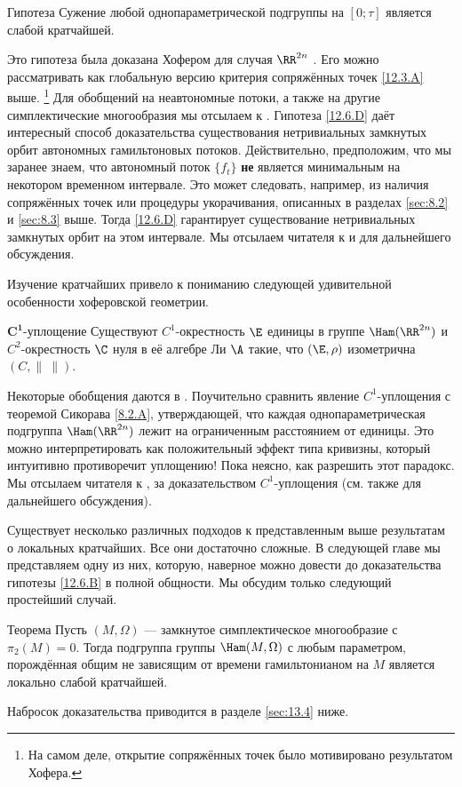 \begin{thm}{Гипотеза}\label{12.6.D}
Сужение любой однопараметрической подгруппы на $[0;\tau]$ является слабой кратчайшей.
\end{thm}

Это гипотеза была доказана Хофером для случая $\RR^{2n}$ \cite{H2}.
Его можно рассматривать как глобальную версию критерия сопряжённых точек \ref{12.3.A} выше.%
\footnote{На самом деле, открытие сопряжённых точек было мотивировано результатом Хофера.} 
Для обобщений на неавтономные потоки, а также на другие симплектические многообразия мы отсылаем к \cite{BP1, Si1,LM2,Sch3,MSl}.
Гипотеза \ref{12.6.D} даёт интересный способ доказательства существования нетривиальных замкнутых орбит автономных гамильтоновых потоков.
Действительно, предположим, что мы заранее знаем, что автономный поток $\{f_t\}$ \textbf{не} является минимальным на некотором временном интервале.
Это может следовать, например, из наличия сопряжённых точек или процедуры укорачивания, описанных в разделах \ref{sec:8.2} и \ref{sec:8.3} выше.
Тогда \ref{12.6.D} гарантирует существование нетривиальных замкнутых орбит на этом интервале.
Мы отсылаем читателя к \cite{LM2} и \cite{P8} для дальнейшего обсуждения.

Изучение кратчайших привело к пониманию следующей удивительной особенности хоферовской геометрии.

\begin{thm}[\cite{BP1}.]{$\bm{C^1}$-уплощение}
\label{12.6.E}
Существуют $C^1$-окрестность $\E$ единицы в группе $\Ham(\RR^{2n})$ и $C^2$-окрестность $\C$ нуля в её алгебре Ли $\A$ такие, что $(\E, \rho)$ изометрична $(C, \|\ \|)$.
\end{thm}

Некоторые обобщения даются в \cite{LM2}.
Поучительно сравнить явление $C^1$-уплощения с теоремой Сикорава \ref{8.2.A}, утверждающей, что каждая однопараметрическая подгруппа $\Ham(\RR^{2n})$ лежит на ограниченным расстоянием от единицы.
Это можно интерпретировать как положительный эффект типа кривизны, который интуитивно противоречит уплощению!
Пока неясно, как разрешить этот парадокс.
Мы отсылаем читателя к \cite{BP1}, \cite{HZ} за доказательством $C^1$-уплощения (см. также \cite{P8} для дальнейшего обсуждения).

Существует несколько различных подходов к представленным выше результатам о локальных кратчайших.
Все они достаточно сложные.
В следующей главе мы представляем одну из них, которую, наверное можно довести до доказательства гипотезы \ref{12.6.B} в полной общности.
Мы обсудим только следующий простейший случай.

\begin{thm}{Теорема}\label{12.6.F}
Пусть $(M, \Omega)$ --- замкнутое симплектическое многообразие с $\pi_2(M) = 0$.
Тогда подгруппа группы $\Ham(M, \Omega)$ с любым параметром, порождённая общим не зависящим от времени гамильтонианом на $M$ является локально слабой кратчайшей.
\end{thm}

Набросок доказательства приводится в разделе \ref{sec:13.4} ниже.
